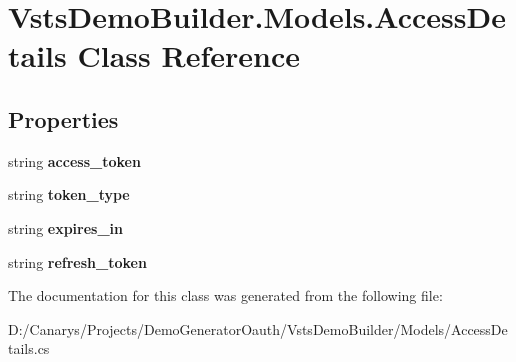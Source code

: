 \hypertarget{class_vsts_demo_builder_1_1_models_1_1_access_details}{}\section{Vsts\+Demo\+Builder.\+Models.\+Access\+Details Class Reference}
\label{class_vsts_demo_builder_1_1_models_1_1_access_details}
\subsection*{Properties}
\begin{DoxyCompactItemize}
\item 
\mbox{\label{class_vsts_demo_builder_1_1_models_1_1_access_details_ad770a95321992a2b7e5dcf0da2503218}} 
string {\bfseries access\+\_\+token}
\item 
\mbox{\label{class_vsts_demo_builder_1_1_models_1_1_access_details_ad8757717118d3d821bbc585703b02e1a}} 
string {\bfseries token\+\_\+type}
\item 
\mbox{\label{class_vsts_demo_builder_1_1_models_1_1_access_details_a0e8fb9803440b6ffa3e19e7e0bbe7d87}} 
string {\bfseries expires\+\_\+in}
\item 
\mbox{\label{class_vsts_demo_builder_1_1_models_1_1_access_details_adaa172c0bf79ee4dba0a09bb927a6732}} 
string {\bfseries refresh\+\_\+token}
\end{DoxyCompactItemize}


The documentation for this class was generated from the following file\+:\begin{DoxyCompactItemize}
\item 
D\+:/\+Canarys/\+Projects/\+Demo\+Generator\+Oauth/\+Vsts\+Demo\+Builder/\+Models/Access\+Details.\+cs\end{DoxyCompactItemize}
